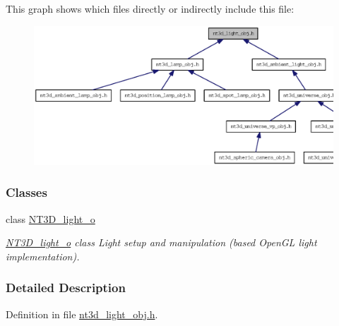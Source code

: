 This graph shows which files directly or indirectly include this file:
\nopagebreak
\begin{figure}[H]
\begin{center}
\leavevmode
\includegraphics[width=400pt]{nt3d__light__obj_8h__dep__incl}
\end{center}
\end{figure}
\subsubsection*{Classes}
\begin{DoxyCompactItemize}
\item 
class \hyperlink{class_n_t3_d__light__o}{NT3D\_\-light\_\-o}
\begin{DoxyCompactList}\small\item\em \hyperlink{class_n_t3_d__light__o}{NT3D\_\-light\_\-o} class Light setup and manipulation (based OpenGL light implementation). \item\end{DoxyCompactList}\end{DoxyCompactItemize}


\subsubsection{Detailed Description}


Definition in file \hyperlink{nt3d__light__obj_8h_source}{nt3d\_\-light\_\-obj.h}.

